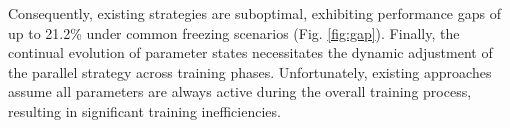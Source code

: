 \documentclass[conference]{IEEEtran}
\begin{document}
Consequently, existing strategies are suboptimal, exhibiting performance gaps of up to 21.2\% under common freezing scenarios (Fig. \ref{fig:gap}).
Finally, the continual evolution of parameter states necessitates the dynamic adjustment of the parallel strategy across training phases.
Unfortunately, existing approaches assume all parameters are always active during the overall training process, resulting in significant training inefficiencies.
\end{document}
